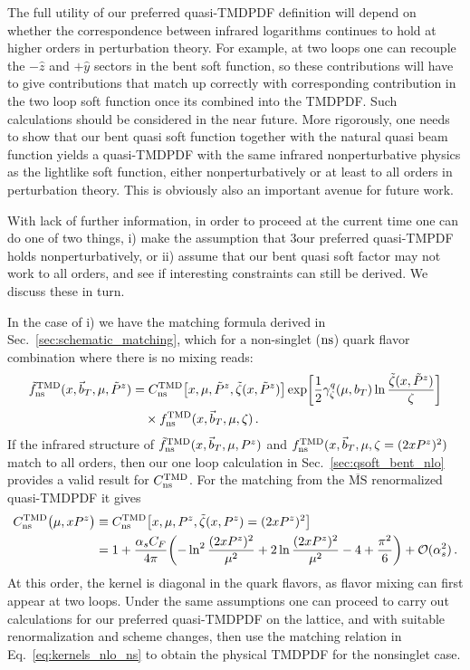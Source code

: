 \documentclass[11pt,a4paper]{article}
\DeclareRobustCommand{\eq}[1]{Eq.~\eqref{eq:#1}}
\DeclareRobustCommand{\sec}[1]{Sec.~\ref{sec:#1}}
\newcommand{\MS}{\overline{\mathrm{MS}}}
\newcommand{\cO}{\mathcal{O}}
\newcommand{\nn}{\nonumber}
\newcommand{\as}{\alpha_s}
\newcommand\TMD{\mathrm{TMD}}
\newcommand{\bt}{\vec b_T}
\newcommand{\ns}{{\rm ns}}
\begin{document}
The full utility of our preferred quasi-TMDPDF definition will depend on whether the correspondence between infrared logarithms continues to hold at higher orders in perturbation theory.  
For example, at two loops one can recouple the $-\hat z$ and $+\hat y$ sectors in the bent soft function, so these contributions will have to give contributions that match up correctly with corresponding contribution in the two loop soft function once its combined into the TMDPDF. Such calculations should be considered in the near future. 
More rigorously, one needs to show that our bent quasi soft function together with the natural quasi beam function yields a quasi-TMDPDF with the same infrared nonperturbative physics as the lightlike soft function, either nonperturbatively or at least to all orders in perturbation theory.
This is obviously also an important avenue for future work.

With lack of further information, in order to proceed at the current time one can do one of two things, i) make the assumption that 3our preferred quasi-TMPDF holds nonperturbatively, or ii) assume that our bent quasi soft factor may not work to all orders, and see if interesting constraints can still be derived. We discuss these in turn.

In the case of i) we have the matching formula derived in \sec{schematic_matching}, which for a non-singlet ($\ns$) quark flavor combination where there is no mixing reads:
\begin{align} \label{eq:matching_result}
\tilde f_{\ns}^\TMD(x, \bt, \mu, \tilde P^z) &
 = C^\TMD_{\ns}\bigl[x, \mu, \tilde P^z, \tilde \zeta(x,\tilde P^z)\bigr]
\exp\biggl[\frac12 \gamma_\zeta^q(\mu,b_T) \ln\frac{\tilde \zeta(x,\tilde P^z)}{\zeta} \biggr]
\nn\\&\quad\times
f^\TMD_{\ns}(x, \bt, \mu, \zeta)
\,.\end{align}
If the infrared structure of $\tilde f_{\ns}^\TMD(x, \bt, \mu, P^z)$ and $f^\TMD_{\ns}(x, \bt, \mu, \zeta=(2xP^z)^2)$ match to all orders, then our one loop calculation in \sec{qsoft_bent_nlo} provides a valid result for $C^\TMD_{\ns}$. For the matching from the $\MS$ renormalized quasi-TMDPDF it gives
\begin{align} \label{eq:kernels_nlo_ns}
 C^\TMD_{\ns}\bigl(\mu, x P^z\bigr) &
 \equiv C_\ns^\TMD\bigl[x, \mu, P^z, \tilde \zeta(x,P^z)=(2xP^z)^2\bigr]
 \nn\\&
 = 1 + \frac{\as C_F}{4\pi} \biggl( - \ln^2\frac{(2 x P^z)^2}{\mu^2}
                       + 2 \ln\frac{(2 x P^z)^2}{\mu^2} -4 + \frac{\pi^2}{6} \biggr) + \cO(\as^2) 
\,.\end{align}
At this order, the kernel is diagonal in the quark flavors, as flavor mixing can first appear at two loops. Under the same assumptions one can proceed to carry out calculations for our preferred quasi-TMDPDF on the lattice, and with suitable renormalization and scheme changes, then use the matching relation in \eq{kernels_nlo_ns} to obtain the physical TMDPDF for the nonsinglet case. 
 
\end{document}

